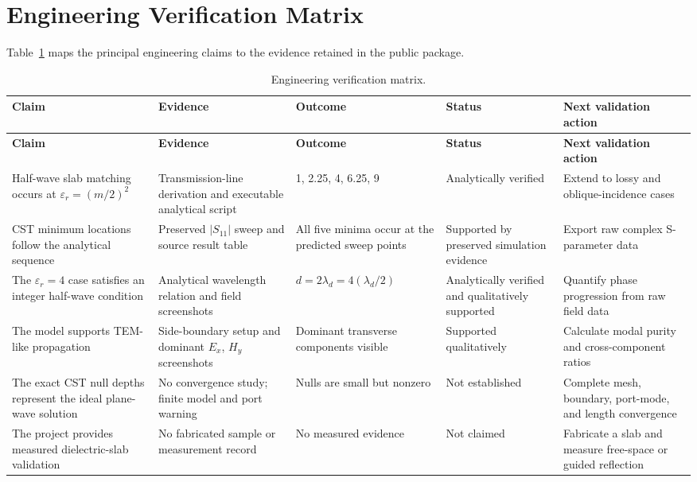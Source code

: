\section{Engineering Verification Matrix}
\label{sec:verification-matrix}

Table~\ref{tab:verification-matrix} maps the principal engineering claims to the
evidence retained in the public package.

\small
\begin{longtable}{@{}p{}p{}p{}p{}p{}@{}}
\caption{Engineering verification matrix.}
\label{tab:verification-matrix}\\
\toprule
\textbf{Claim} & \textbf{Evidence} & \textbf{Outcome} & \textbf{Status} & \textbf{Next validation action} \\
\midrule
\endfirsthead

\toprule
\textbf{Claim} & \textbf{Evidence} & \textbf{Outcome} & \textbf{Status} & \textbf{Next validation action} \\
\midrule
\endhead

Half-wave slab matching occurs at $\varepsilon_r=(m/2)^2$
&
Transmission-line derivation and executable analytical script
&
1, 2.25, 4, 6.25, 9
&
Analytically verified
&
Extend to lossy and oblique-incidence cases
\\
\addlinespace[3pt]

CST minimum locations follow the analytical sequence
&
Preserved $|S_{11}|$ sweep and source result table
&
All five minima occur at the predicted sweep points
&
Supported by preserved simulation evidence
&
Export raw complex S-parameter data
\\
\addlinespace[3pt]

The $\varepsilon_r=4$ case satisfies an integer half-wave condition
&
Analytical wavelength relation and field screenshots
&
$d=2\lambda_d=4(\lambda_d/2)$
&
Analytically verified and qualitatively supported
&
Quantify phase progression from raw field data
\\
\addlinespace[3pt]

The model supports TEM-like propagation
&
Side-boundary setup and dominant $E_x$, $H_y$ screenshots
&
Dominant transverse components visible
&
Supported qualitatively
&
Calculate modal purity and cross-component ratios
\\
\addlinespace[3pt]

The exact CST null depths represent the ideal plane-wave solution
&
No convergence study; finite model and port warning
&
Nulls are small but nonzero
&
Not established
&
Complete mesh, boundary, port-mode, and length convergence
\\
\addlinespace[3pt]

The project provides measured dielectric-slab validation
&
No fabricated sample or measurement record
&
No measured evidence
&
Not claimed
&
Fabricate a slab and measure free-space or guided reflection
\\
\bottomrule
\end{longtable}
\normalsize
